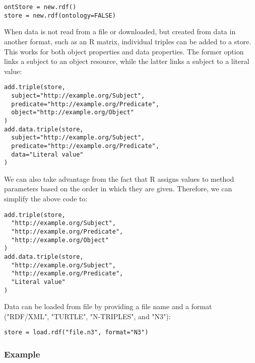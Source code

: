 \documentclass[12pt]{article}
\begin{document}
\begin{footnotesize}
\begin{verbatim}
ontStore = new.rdf()
store = new.rdf(ontology=FALSE)
\end{verbatim}
\end{footnotesize}

When data is not read from a file or downloaded, but created from data in another format,
such as an R matrix, individual triples can be added to a store. This works for both
object properties and data properties. The former option links a subject to an object
resource, while the latter links a subject to a literal value:

\begin{footnotesize}
\begin{verbatim}
add.triple(store,
  subject="http://example.org/Subject",
  predicate="http://example.org/Predicate",
  object="http://example.org/Object"
)
add.data.triple(store,
  subject="http://example.org/Subject",
  predicate="http://example.org/Predicate",
  data="Literal value"
)
\end{verbatim}
\end{footnotesize}

We can also take advantage from the fact that R assigns values to method parameters based on
the order in which they are given. Therefore, we can simplify the above code to:

\begin{footnotesize}
\begin{verbatim}
add.triple(store,
  "http://example.org/Subject",
  "http://example.org/Predicate",
  "http://example.org/Object"
)
add.data.triple(store,
  "http://example.org/Subject",
  "http://example.org/Predicate",
  "Literal value"
)
\end{verbatim}
\end{footnotesize}


Data can be loaded from file by providing a file name and a format ("RDF/XML", "TURTLE",
"N-TRIPLES", and "N3"):

\begin{footnotesize}
\begin{verbatim}
store = load.rdf("file.n3", format="N3")
\end{verbatim}
\end{footnotesize}

\subsubsection{Example}
\end{document}

